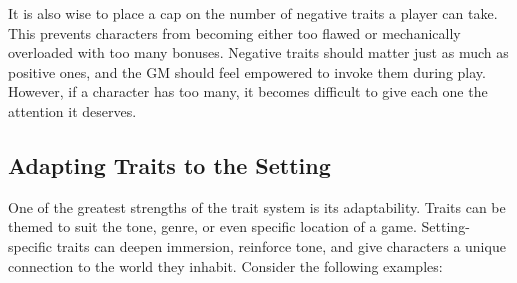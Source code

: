 It is also wise to place a cap on the number of negative traits a player can take. This prevents characters from becoming either too flawed or mechanically overloaded with too many bonuses. Negative traits should matter just as much as positive ones, and the GM should feel empowered to invoke them during play. However, if a character has too many, it becomes difficult to give each one the attention it deserves.


\subsection{Adapting Traits to the Setting}

One of the greatest strengths of the trait system is its adaptability. Traits can be themed to suit the tone, genre, or even specific location of a game. Setting-specific traits can deepen immersion, reinforce tone, and give characters a unique connection to the world they inhabit. Consider the following examples:

